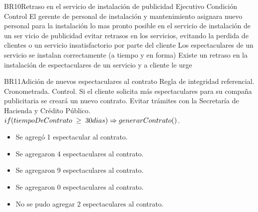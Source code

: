 \hypertarget{BR:BR10}{}
\begin{BussinesRule}{BR10}{Retraso en el servicio de instalación de publicidad}%
    \BRitem[Tipo: ] Ejecutivo
    \BRitem[Clase:] Condición 
    \BRitem[Nivel:] Control
    \BRitem[Descripción:] El gerente de personal de instalación y mantenimiento asignara nuevo personal para la instalación lo mas pronto posible en el servicio de instalación de un ser vicio de publicidad 
    \BRitem[Motivación: ] evitar retrasos en los servicios, evitando la perdida de clientes o un servicio insatisfactorio por parte del cliente
     Los espectaculares de un servicio se instalan correctamente (a tiempo y en forma)
     Existe un retraso en la instalación de espectaculares de un servicio y a cliente le urge
\end{BussinesRule}

\hypertarget{BR:BR11}{}
\begin{BussinesRule}{BR11}{Adición de nuevos espectaculares al contrato}
    \BRitem[Tipo: ] Regla de integridad referencial.
    \BRitem[Clase:] Cronometrada.
    \BRitem[Nivel:] Control.
    \BRitem[Descripción: ] Si el cliente solicita más espectaculares para su compaña publicitaria se creará un nuevo contrato.
    \BRitem[Motivación: ] Evitar trámites con la Secretaría de Hacienda y Crédito Público.
    \BRitem[Sentencia: ] $ if(tiempoDeContrato \hspace{0.1cm} \geq \hspace{0.1cm} 30 dias) \Rightarrow generarContrato() $.
    \begin{itemize}
        \item Se agregó 1 espectacular al contrato.
        \item Se agregaron 4 espectaculares al contrato.
        \item Se agregaron 9 espectaculares al contrato.
    \end{itemize}
    \begin{itemize}
        \item Se agregaron 0 espectaculares al contrato.
        \item No se pudo agregar 2 espectaculares al contrato.
    \end{itemize}
\end{BussinesRule}


